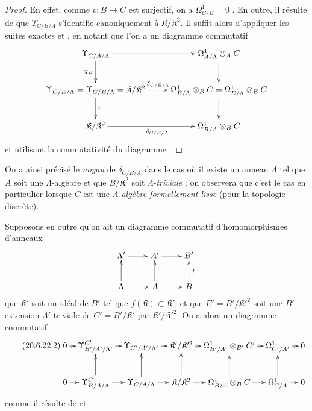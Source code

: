 \begin{proof}
En effet, comme $v:B\to C$ est surjectif, on a $\Omega^1_{C/B}=0$
. En outre, il résulte de  que
$\Upsilon_{C/B/\Lambda}$ s'identifie canoniquement à
$\mathfrak{K}/\mathfrak{K}^2$. Il suffit alors d'appliquer les suites exactes
 et , en notant que l'on a un
diagramme commutatif
\[
\xymatrix{
  \Upsilon_{C/A/\Lambda} \ar[r] \ar[d]_{\chi_E} &
  \Omega^1_{A/\Lambda}\otimes_A C \ar[d] \\
  \Upsilon_{C/E/\Lambda}=\Upsilon_{C/B/\Lambda}=\mathfrak{K}/\mathfrak{K}^2
    \ar[r]^-{\delta_{C/B/\Lambda}} \ar[d]^{\wr} &
  \Omega^1_{B/\Lambda}\otimes_B C=\Omega^1_{E/\Lambda}\otimes_E C \ar[d] \\
  \mathfrak{K}/\mathfrak{K}^2 \ar[r]_{\delta_{C/B/A}} &
  \Omega^1_{B/A}\otimes_B C
}
\]
et utilisant la commutativité du diagramme .
\end{proof}

On a ainsi précisé le \emph{noyau} de $\delta_{C/B/A}$ dans le cas où il
existe un anneau $\Lambda$ tel que $A$ soit une $\Lambda$-algèbre et que
$B/\mathfrak{K}^2$ soit $\Lambda$-\emph{triviale} ; on observera que c'est le cas
en particulier lorsque $C$ est une \emph{$\Lambda$-algèbre formellement
lisse} (pour la topologie discrète).

Supposons en outre qu'on ait un diagramme commutatif d'homomorphismes
d'anneaux
\[
\xymatrix{
  \Lambda' \ar[r] & A' \ar[r] & B' \\
  \Lambda \ar[u] \ar[r] & A \ar[u] \ar[r] & B \ar[u]_f
}
\]
que $\mathfrak{K}'$ soit un idéal de $B'$ tel que
$f(\mathfrak{K})\subset\mathfrak{K}'$, et que
$E'=B'/\mathfrak{K}'^2$ soit une $B'$-extension $\Lambda'$-triviale de
$C'=B'/\mathfrak{K}'$ par $\mathfrak{K}'/\mathfrak{K}'^2$. On a alors un
diagramme commutatif
\begin{equation}
\tag{20.6.22.2}
\label{0.20.6.22.2-fr}
\xymatrix@C=0.7em{
  0 \ar[r] & \Upsilon^{C'}_{B'/A'/\Lambda'} \ar[r] &
  \Upsilon_{C'/A'/\Lambda'} \ar[r] &
  \mathfrak{K}'/\mathfrak{K}'^2 \ar[r] &
  \Omega^1_{B'/A'}\otimes_{B'} C' \ar[r] &
  \Omega^1_{C'/A'} \ar[r] & 0 \\
  0 \ar[r] & \Upsilon^C_{B/A/\Lambda} \ar[r] \ar[u] &
  \Upsilon_{C/A/\Lambda} \ar[r] \ar[u] &
  \mathfrak{K}/\mathfrak{K}^2 \ar[r] \ar[u] &
  \Omega^1_{B/A}\otimes_B C \ar[r] \ar[u] &
  \Omega^1_{C/A} \ar[r] \ar[u] & 0
}
\end{equation}
comme il résulte de  et .

